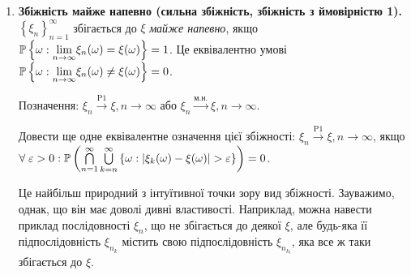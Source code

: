 \noindent\begin{enumerate}
    \item \textbf{Збіжність майже напевно (сильна збіжність, збіжність з ймовірністю 1).}
    \noindent$\left\{ \xi_n\right\}_{n=1}^{\infty}$ збігається до $\xi$ \emph{майже напевно}, якщо
    $\P\left\{ \omega: \underset{n\to\infty}{\lim} \xi_n(\omega) = \xi(\omega)\right\} = 1$. 
    Це еквівалентно умові $\P\left\{ \omega: \underset{n\to\infty}{\lim} \xi_n(\omega) \neq \xi(\omega)\right\} = 0$.

    Позначення: $\xi_n \overset{\mathrm{P1}}{\longrightarrow} \xi, n \to \infty$ або $\xi_n \overset{\text{м.н.}}{\longrightarrow} \xi, n \to \infty$.
    \begin{exercise}
        Довести ще одне еквівалентне означення цієї збіжності: $\xi_n \overset{\mathrm{P1}}{\longrightarrow} \xi, n \to \infty$, якщо
        $\forall \; \varepsilon > 0: \P\left( \bigcap\limits_{n=1}^{\infty} \bigcup\limits_{k = n}^{\infty}
        \left\{ \omega : \left| \xi_k(\omega) - \xi(\omega)\right| > \varepsilon\right\}\right) = 0$.
    \end{exercise}

    Це найбільш природний з інтуїтивної точки зору вид збіжності. Зауважимо, однак, що він має доволі дивні властивості. Наприклад, можна навести приклад
    послідовності $\xi_n$, що не збігається до деякої $\xi$, але будь-яка її підпослідовність $\xi_{n_k}$ містить свою підпослідовність
    $\xi_{n_{k_l}}$, яка все ж таки збігається до $\xi$.
    

\end{enumerate}
